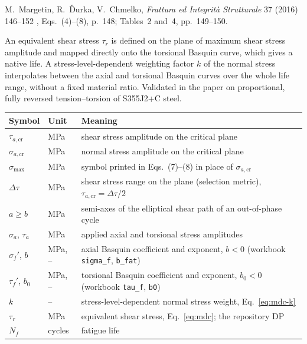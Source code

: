 \label{sheet:MDC}

 M.~Margetin, R.~\v{D}urka, V.~Chmelko, \emph{Frattura ed Integrit\`a Strutturale} 37
(2016) 146--152 \cite{margetin2016}, Eqs.~(4)--(8), p.~148; Tables~2 and~4, pp.~149--150.

 An equivalent shear stress $\tau_r$ is defined on the plane of maximum shear
stress amplitude and mapped directly onto the torsional Basquin curve, which gives a native life. A
stress-level-dependent weighting factor $k$ of the normal stress interpolates between the axial and
torsional Basquin curves over the whole life range, without a fixed material ratio. Validated in the
paper on proportional, fully reversed tension--torsion of S355J2+C steel.

\begin{center}\small
\begin{tabular}{@{}llp{100mm}@{}}
\toprule
Symbol & Unit & Meaning\\\midrule
$\tau_{a,\mathrm{cr}}$ & MPa & shear stress amplitude on the critical plane\\
$\sigma_{a,\mathrm{cr}}$ & MPa & normal stress amplitude on the critical plane\\
$\sigma_{\max}$ & MPa & symbol printed in Eqs.~(7)--(8) in place of $\sigma_{a,\mathrm{cr}}$\\
$\Delta\tau$ & MPa & shear stress range on the plane (selection metric), $\tau_{a,\mathrm{cr}}=\Delta\tau/2$\\
$a\ge b$ & MPa & semi-axes of the elliptical shear path of an out-of-phase cycle\\
$\sigma_a$, $\tau_a$ & MPa & applied axial and torsional stress amplitudes\\
$\sigma_f'$, $b$ & MPa, -- & axial Basquin coefficient and exponent, $b<0$ (workbook \texttt{sigma\_f}, \texttt{b\_fat})\\
$\tau_f'$, $b_0$ & MPa, -- & torsional Basquin coefficient and exponent, $b_0<0$ (workbook \texttt{tau\_f}, \texttt{b0})\\
$k$ & -- & stress-level-dependent normal stress weight, Eq.~\eqref{eq:mdc-k}\\
$\tau_r$ & MPa & equivalent shear stress, Eq.~\eqref{eq:mdc}; the repository DP\\
$N_f$ & cycles & fatigue life\\
\bottomrule
\end{tabular}
\end{center}

